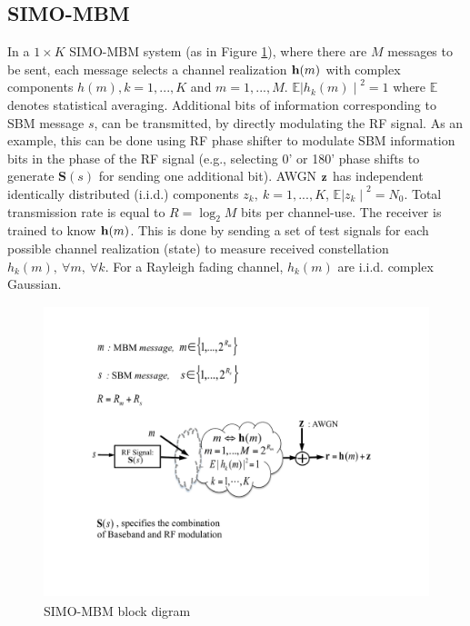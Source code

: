 \subsection{SIMO-MBM}
In a $ 1\times K $ SIMO-MBM system (as in Figure \ref{SIMO-MBM}), where there are $M$ messages to be sent, each message selects a channel realization $\mathbf{h}(m)$ with complex components $h(m), k = 1, ..., K $ and $m = 1, ..., M$. $\mathbb{E} {\mid\!h_k(m)\!\mid }^2 = 1$ where $\mathbb{E}$ denotes statistical averaging. Additional bits of information corresponding to SBM message $s$, can be transmitted, by directly modulating the RF signal. As an example, this can be done using RF phase shifter to modulate SBM information bits in the phase of the RF signal (e.g., selecting 0' or 180' phase shifts to generate $\mathbf{S}(s)$ for sending one additional bit). AWGN $\mathbf{z}$ has independent identically distributed (i.i.d.) components $z_k, \ k = 1, ..., K$, $ \mathbb{E}{\mid z_k \mid} ^2 = N_0$. Total transmission rate is equal to $R = \log_{2}{M}$ bits per channel-use. The receiver is trained to know $\mathbf{h}(m)$. This is done by sending a set of test signals for each possible channel realization (state) to measure received constellation $h_k(m), \ \forall m , \ \forall k$. For a Rayleigh fading channel,  $h_k(m)$ are i.i.d. complex Gaussian.

\begin{figure}[t]
\centering
\includegraphics[width = 12.5cm, height = 8.5cm, trim = 0cm 0cm 0cm 1cm ]{./fig/SIMOSystemModel_v4-AK}
\caption{SIMO-MBM block digram}
\label{SIMO-MBM}
\end{figure}

